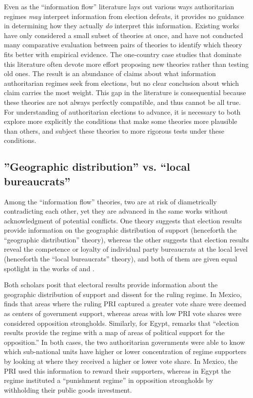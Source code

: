 \documentclass[12pt]{article}\usepackage[]{graphicx}\usepackage[]{color}
\newcommand{\1}{\mathbbm{1}}
\begin{document}
Even as the ``information flow'' literature lays out various ways authoritarian regimes \textit{may} interpret information from election defeats, it provides no guidance in determining how they actually \textit{do} interpret this information. Existing works have only considered a small subset of theories at once, and have not conducted many comparative evaluation between pairs of theories to identify which theory fits better with empirical evidence. The one-country case studies that dominate this literature \citep{LustOkar2005, Geddes2005, Magaloni2006, Blaydes2008} often devote more effort proposing new theories rather than testing old ones. The result is an abundance of claims about what information authoritarian regimes seek from elections, but no clear conclusion about which claim carries the most weight. This gap in the literature is consequential because these theories are not always perfectly compatible, and thus cannot be all true. For understanding of authoritarian elections to advance, it is necessary to both explore more explicitly the conditions that make some theories more plausible than others, and subject these theories to more rigorous tests under these conditions.

\subsection{''Geographic distribution'' vs. ``local bureaucrats''}
Among the ``information flow'' theories, two are at risk of diametrically contradicting each other, yet they are advanced in the same works without acknowledgment of potential conflicts. One theory suggests that election results provide information on the geographic distribution of support (henceforth the ``geographic distribution'' theory), whereas the other suggests that election results reveal the competence or loyalty of individual party bureaucrats at the local level (henceforth the ``local bureaucrats'' theory), and both of them are given equal spotlight in the works of \cite{Magaloni2006} and \cite{Blaydes2008}.

Both scholars posit that electoral results provide information about the geographic distribution of support and dissent for the ruling regime. In Mexico, \cite{Magaloni2006} finds that areas where the ruling PRI captured a greater vote share were deemed as centers of government support, whereas areas with low PRI vote shares were considered opposition strongholds. Similarly, for Egypt, \cite{Blaydes2008} remarks that “election results provide the regime with a map of areas of political support for the opposition.” In both cases, the two authoritarian governments were able to know which sub-national units have higher or lower concentration of regime supporters by looking at where they received a higher or lower vote share. In Mexico, the PRI used this information to reward their supporters, whereas in Egypt the regime instituted a “punishment regime” in opposition strongholds by withholding their public goods investment.
\end{document}
